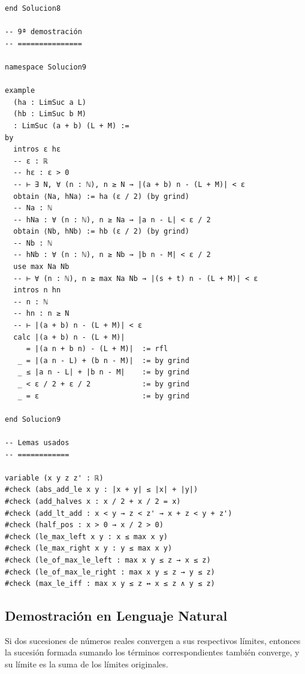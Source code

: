 \begin{verbatim}
end Solucion8

-- 9ª demostración
-- ===============

namespace Solucion9

example
  (ha : LimSuc a L)
  (hb : LimSuc b M)
  : LimSuc (a + b) (L + M) :=
by
  intros ε hε
  -- ε : ℝ
  -- hε : ε > 0
  -- ⊢ ∃ N, ∀ (n : ℕ), n ≥ N → |(a + b) n - (L + M)| < ε
  obtain ⟨Na, hNa⟩ := ha (ε / 2) (by grind)
  -- Na : ℕ
  -- hNa : ∀ (n : ℕ), n ≥ Na → |a n - L| < ε / 2
  obtain ⟨Nb, hNb⟩ := hb (ε / 2) (by grind)
  -- Nb : ℕ
  -- hNb : ∀ (n : ℕ), n ≥ Nb → |b n - M| < ε / 2
  use max Na Nb
  -- ⊢ ∀ (n : ℕ), n ≥ max Na Nb → |(s + t) n - (L + M)| < ε
  intros n hn
  -- n : ℕ
  -- hn : n ≥ N
  -- ⊢ |(a + b) n - (L + M)| < ε
  calc |(a + b) n - (L + M)|
     = |(a n + b n) - (L + M)|  := rfl
   _ = |(a n - L) + (b n - M)|  := by grind
   _ ≤ |a n - L| + |b n - M|    := by grind
   _ < ε / 2 + ε / 2            := by grind
   _ = ε                        := by grind

end Solucion9

-- Lemas usados
-- ============

variable (x y z z' : ℝ)
#check (abs_add_le x y : |x + y| ≤ |x| + |y|)
#check (add_halves x : x / 2 + x / 2 = x)
#check (add_lt_add : x < y → z < z' → x + z < y + z')
#check (half_pos : x > 0 → x / 2 > 0)
#check (le_max_left x y : x ≤ max x y)
#check (le_max_right x y : y ≤ max x y)
#check (le_of_max_le_left : max x y ≤ z → x ≤ z)
#check (le_of_max_le_right : max x y ≤ z → y ≤ z)
#check (max_le_iff : max x y ≤ z ↔ x ≤ z ∧ y ≤ z)
\end{verbatim}

\subsection{Demostración en Lenguaje Natural}

\begin{theorem}
Si dos sucesiones de números reales convergen a sus respectivos límites,
entonces la sucesión formada sumando los términos correspondientes también
converge, y su límite es la suma de los límites originales.
\end{theorem}

